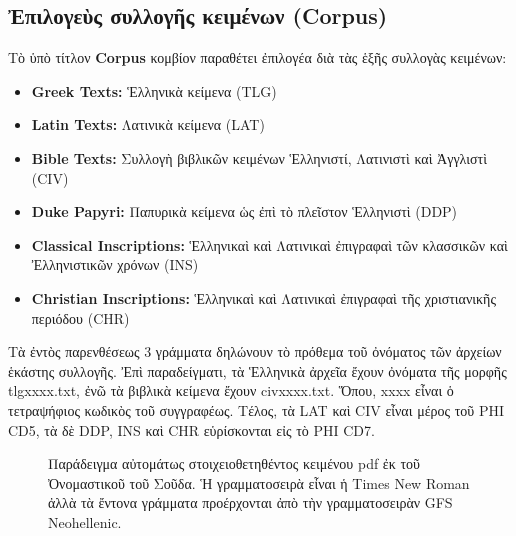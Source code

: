 \documentclass[12pt,a4paper]{article}
\begin{document}
  \subsection{Ἐπιλογεὺς συλλογῆς κειμένων (Corpus)}
    Τὸ ὑπὸ τίτλον {\bf Corpus} κομβίον παραθέτει ἐπιλογέα
    διὰ τὰς ἑξῆς συλλογὰς κειμένων:
    \begin{itemize}
      \item{\bf Greek Texts: }Ἑλληνικὰ κείμενα  (TLG)
      \item{\bf Latin Texts: }Λατινικὰ κείμενα  (LAT)
      \item{\bf Bible Texts: }Συλλογὴ βιβλικῶν κειμένων Ἑλληνιστί,
                        Λατινιστὶ καὶ Ἀγγλιστὶ  (CIV)
      \item{\bf Duke Papyri: }Παπυρικὰ κείμενα ὡς ἐπὶ τὸ πλεῖστον
          Ἑλληνιστὶ (DDP)
      \item{\bf Classical Inscriptions: }Ἑλληνικαὶ καὶ Λατινικαὶ ἐπιγραφαὶ
          τῶν κλασσικῶν καὶ Ἐλληνιστικῶν χρόνων (INS)
      \item{\bf Christian Inscriptions: }Ἑλληνικαὶ καὶ Λατινικαὶ ἐπιγραφαὶ
          τῆς χριστιανικῆς περιόδου (CHR)
    \end{itemize}
    Τὰ ἐντὸς παρενθέσεως 3 γράμματα δηλώνουν τὸ πρόθεμα τοῦ ὀνόματος τῶν
    ἀρχείων ἑκάστης συλλογῆς. Ἐπὶ παραδείγματι, τὰ Ἑλληνικὰ ἀρχεῖα ἔχουν
    ὀνόματα τῆς μορφῆς tlgxxxx.txt, ἐνῶ τὰ βιβλικὰ κείμενα ἔχουν civxxxx.txt.
    Ὅπου, xxxx εἶναι ὁ τετραψήφιος κωδικὸς τοῦ συγγραφέως.
    Τέλος, τὰ LAT καὶ CIV εἶναι μέρος τοῦ PHI CD5, τὰ δὲ DDP, INS καὶ CHR
    εὑρίσκονται εἰς τὸ PHI CD7.
              \begin{figure}[htb]
                \begin{center}
                  \caption{Παράδειγμα αὐτομάτως στοιχειοθετηθέντος
                           κειμένου pdf ἐκ τοῦ Ὀνομαστικοῦ τοῦ
                           Σοῦδα.
                           Ἡ γραμματοσειρὰ εἶναι ἡ Times New Roman ἀλλὰ
                           τὰ ἔντονα γράμματα προέρχονται ἀπὸ τὴν
                           γραμματοσειρὰν GFS Neohellenic.
                           }
                \end{center}
              \end{figure}
\end{document}
